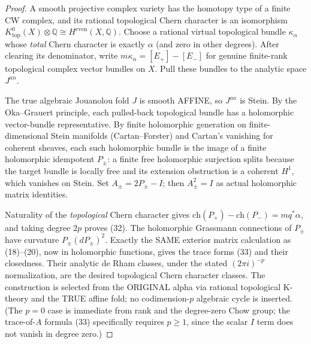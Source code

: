 \documentclass[11pt]{article}
\begin{document}
\begin{proof}
A smooth projective complex variety has the homotopy type of a
finite CW complex, and its rational topological Chern character
is an isomorphism
$K^0_{\mathrm{top}}(X)\otimes\mathbb Q
 \cong H^{\mathrm{even}}(X,\mathbb Q)$.
Choose a rational virtual topological bundle $\kappa_\alpha$
whose \emph{total} Chern character is exactly $\alpha$
(and zero in other degrees). After clearing its denominator,
write $m\kappa_\alpha=[E_+]-[E_-]$ for genuine finite-rank
topological complex vector bundles on $X$.
Pull these bundles to the analytic space $J^{an}$.

The true algebraic Jouanolou fold $J$ is smooth AFFINE,
so $J^{an}$ is Stein. By the Oka--Grauert principle,
each pulled-back topological bundle has a holomorphic
vector-bundle representative. By finite holomorphic generation
on finite-dimensional Stein manifolds (Cartan--Forster) and
Cartan's vanishing for coherent sheaves,
each such holomorphic bundle is the image of a
finite holomorphic idempotent $P_\pm$:
a finite free holomorphic surjection splits because
the target bundle is locally free and its extension
obstruction is a coherent $H^1$, which vanishes on Stein.
Set $A_\pm=2P_\pm-I$; then $A_\pm^2=I$ as
actual holomorphic matrix identities.

Naturality of the \emph{topological} Chern character
gives
$\mathrm{ch}(P_+)-\mathrm{ch}(P_-)=m q^*\alpha$,
and taking degree $2p$ proves (32).
The holomorphic Grassmann connections of $P_\pm$
have curvature $P_\pm(dP_\pm)^2$.
Exactly the SAME exterior matrix calculation as (18)--(20),
now in holomorphic functions, gives the trace forms (33)
and their closedness. Their analytic de Rham classes,
under the stated $(2\pi i)^{-p}$ normalization,
are the desired topological Chern character classes.
The construction is selected from the ORIGINAL alpha
via rational topological K-theory and the TRUE affine fold;
no codimension-$p$ algebraic cycle is inserted.
(The $p=0$ case is immediate from rank and the degree-zero
Chow group; the trace-of-$A$ formula (33) specifically requires
$p\ge1$, since the scalar $I$ term does not vanish in degree zero.)
\end{proof}
\end{document}
